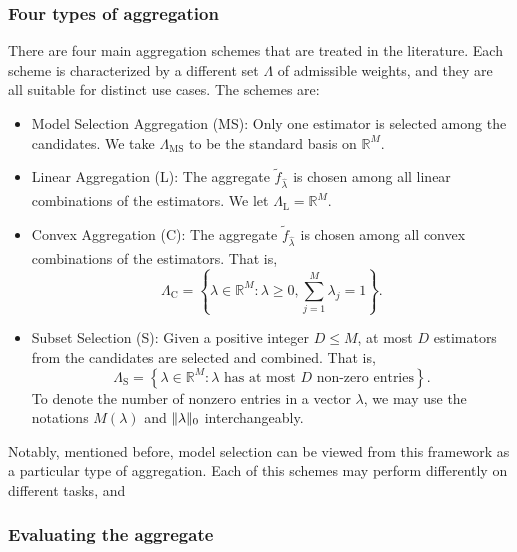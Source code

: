 \documentclass[11pt, letter paper]{article}
\newcommand{\1}{\mathmybb{1}}
\newcommand{\R}{\mathbb{R}}
\newcommand{\0}{\emptyset}
\newcommand{\set}[1]{\left\{ #1 \right\}}
\newcommand{\norm}[1]{|\hspace{-1pt}|#1 |\hspace{-1pt}|}
\newcommand{\ftilde}[1]{\tilde{f}_{#1}}
\newcommand{\lambdahat}[1]{\hat{\lambda}_{#1}}
\begin{document}
\subsubsection{Four types of aggregation}\label{sec:buneaschemes}

There are four main aggregation schemes that are treated in the literature. Each scheme is characterized by a different set \(\Lambda\) of admissible weights, and they are all suitable for distinct use cases. The schemes are:
\begin{itemize}
    \item Model Selection Aggregation (MS): Only one estimator is selected among the candidates. We take \(\Lambda_{\mathrm{MS}}\) to be the standard basis on \(\R^{M}\).
    \item Linear Aggregation (L): The aggregate \(\ftilde{\lambdahat{}}\) is chosen among all linear combinations of the estimators. We let \(\Lambda_{\mathrm{L}} = \R^{M}\).
    \item Convex Aggregation (C): The aggregate \(\ftilde{\lambdahat{}}\) is chosen among all convex combinations of the estimators. That is, \[\Lambda_{\mathrm{C}} = \set{\lambda\in\R^{M}:\lambda\geq 0, \sum_{j=1}^{M}\lambda_{j} = 1}.\]
    \item Subset Selection (S): Given a positive integer \(D\leq M\), at most \(D\) estimators from the candidates are selected and combined. That is, \[\Lambda_{\mathrm{S}} = \set{\lambda\in\R^{M}:\lambda\text{ has at most \(D\) non-zero entries}}.\]
    To denote the number of nonzero entries in a vector \(\lambda\), we may use the notations \(M(\lambda)\) and \(\norm{\lambda}_{0}\) interchangeably.
\end{itemize}

Notably, mentioned before, model selection can be viewed from this framework as a particular type of aggregation. Each of this schemes may perform differently on different tasks, and 

\subsubsection{Evaluating the aggregate}
\end{document}
